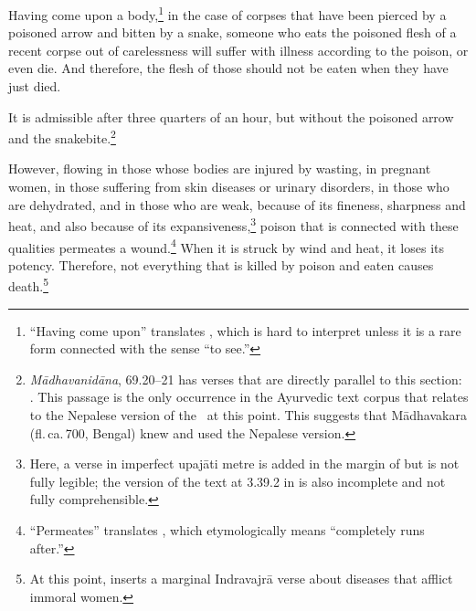 \begin{translation}[resume]
\dag Having come upon a body,\footnote{“Having come upon” translates
    , which is hard to interpret unless it is a rare form
    connected with the sense “to see.”} in the case of corpses that have
    been pierced by a poisoned arrow and bitten by a snake, someone who
    eats the poisoned flesh of a recent corpse out of carelessness will
    suffer with illness according to the poison, or even die. And
    therefore, the flesh of those should not be eaten when they have just
    died.
    
It is admissible after three quarters of an hour, but without the
poisoned arrow and the snakebite.\footnote{\emph{Mādhavanidāna},
    69.20--21 \citep[480]{madhava1} has verses that are directly parallel
    to this section: . This passage is the only occurrence in the Ayurvedic text
    corpus that relates to the Nepalese version of the \SS\ at this point.
    This suggests that Mādhavakara (fl.\,ca.\,700, Bengal) knew and used
    the Nepalese version.}

\item[35.add1--add3] 

However, flowing in those whose bodies are injured by wasting, in
pregnant women, in those suffering from skin diseases or urinary
disorders, in those who are dehydrated, and in those who are weak,
because of its fineness, sharpness and heat, and also because of its
expansiveness,\footnote{Here, a verse in imperfect upajāti metre is
    added in the margin of  but is not fully legible;
    the version of the text at 3.39.2 in  is also
    incomplete and not fully comprehensible.} %
    poison that is connected with these qualities permeates a
    wound.\footnote{“Permeates” translates , which
        etymologically means “completely runs after.”} When it is struck by
        wind and heat, it loses its potency. Therefore, not everything that is
        killed by poison and eaten causes death.\footnote{At this point,
             inserts a marginal Indravajrā verse about
            diseases that afflict immoral women.}
  


\end{translation}
